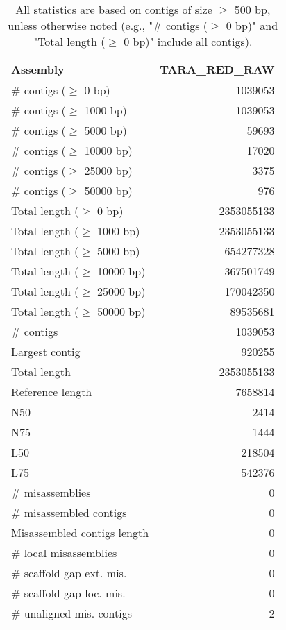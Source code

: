 \documentclass[12pt,a4paper]{article}
\begin{document}
\begin{table}[ht]
\begin{center}
\caption{All statistics are based on contigs of size $\geq$ 500 bp, unless otherwise noted (e.g., "\# contigs ($\geq$ 0 bp)" and "Total length ($\geq$ 0 bp)" include all contigs).}
\begin{tabular}{|l*{1}{|r}|}
\hline
Assembly & TARA\_RED\_RAW \\ \hline
\# contigs ($\geq$ 0 bp) & 1039053 \\ \hline
\# contigs ($\geq$ 1000 bp) & 1039053 \\ \hline
\# contigs ($\geq$ 5000 bp) & 59693 \\ \hline
\# contigs ($\geq$ 10000 bp) & 17020 \\ \hline
\# contigs ($\geq$ 25000 bp) & 3375 \\ \hline
\# contigs ($\geq$ 50000 bp) & 976 \\ \hline
Total length ($\geq$ 0 bp) & 2353055133 \\ \hline
Total length ($\geq$ 1000 bp) & 2353055133 \\ \hline
Total length ($\geq$ 5000 bp) & 654277328 \\ \hline
Total length ($\geq$ 10000 bp) & 367501749 \\ \hline
Total length ($\geq$ 25000 bp) & 170042350 \\ \hline
Total length ($\geq$ 50000 bp) & 89535681 \\ \hline
\# contigs & 1039053 \\ \hline
Largest contig & 920255 \\ \hline
Total length & 2353055133 \\ \hline
Reference length & 7658814 \\ \hline
N50 & 2414 \\ \hline
N75 & 1444 \\ \hline
L50 & 218504 \\ \hline
L75 & 542376 \\ \hline
\# misassemblies & 0 \\ \hline
\# misassembled contigs & 0 \\ \hline
Misassembled contigs length & 0 \\ \hline
\# local misassemblies & 0 \\ \hline
\# scaffold gap ext. mis. & 0 \\ \hline
\# scaffold gap loc. mis. & 0 \\ \hline
\# unaligned mis. contigs & 2 \\ \hline

\end{tabular}
\end{center}
\end{table}
\end{document}
